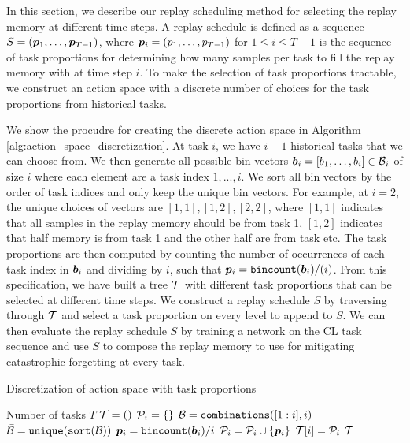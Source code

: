 In this section, we describe our replay scheduling method for selecting the replay memory at different time steps. A replay schedule is defined as a sequence $S = ({\bm{p}}_1, \dots, {\bm{p}}_{T-1})$, where ${\bm{p}}_i = (p_1, \dots, p_{T-1})$ for $1 \leq i \leq T-1$ is the sequence of task proportions for determining how many samples per task to fill the replay memory with at time step $i$. To make the selection of task proportions tractable, we construct an action space with a discrete number of choices for the task proportions from historical tasks. 

We show the procudre for creating the discrete action space in Algorithm \ref{alg:action_space_discretization}. At task $i$, we have $i-1$ historical tasks that we can choose from. We then generate all possible bin vectors ${\bm{b}}_i = [b_1, \dots, b_{i}] \in {\mathcal{B}}_i$ of size $i$ where each element are a task index $1, ..., i$. We sort all bin vectors by the order of task indices and only keep the unique bin vectors. For example, at $i=2$, the unique choices of vectors are $[1,1], [1,2], [2,2]$, where $[1,1]$ indicates that all samples in the replay memory should be from task 1, $[1,2]$ indicates that half memory is from task 1 and the other half are from task etc. The task proportions are then computed by counting the number of occurrences of each task index in ${\bm{b}}_i$ and dividing by $i$, such that ${\bm{p}}_i = \texttt{bincount}({\bm{b}}_i) / (i)$. From this specification, we have built a tree ${\mathcal{T}}$ with different task proportions that can be selected at different time steps. We construct a replay schedule $S$ by traversing through ${\mathcal{T}}$ and select a task proportion on every level to append to $S$. We can then evaluate the replay schedule $S$ by training a network on the CL task sequence and use $S$ to compose the replay memory to use for mitigating catastrophic forgetting at every task. 


\begin{algorithm}[t]
	\caption{Discretization of action space with task proportions}
	\label{alg:action_space_discretization}
	\begin{algorithmic}[1]
		\Require Number of tasks $T$
		\State ${\mathcal{T}} = ()$ 
		\State ${\mathcal{P}}_i = \{\}$ 
		\State ${\mathcal{B}} = \texttt{combinations}([1:i], i)$ 
		\State $\bar{{\mathcal{B}}} = \texttt{unique}(\texttt{sort}({\mathcal{B}}))$ 
		\State ${\bm{p}}_i = \texttt{bincount}({\bm{b}}_i) / i$ 
		\State ${\mathcal{P}}_i = {\mathcal{P}}_i \cup \{ {\bm{p}}_i \}$ 
		\EndFor
		\State ${\mathcal{T}}[i] = {\mathcal{P}}_i$ 
		\EndFor
		\State \Return ${\mathcal{T}}$ 
	\end{algorithmic}
\end{algorithm}



